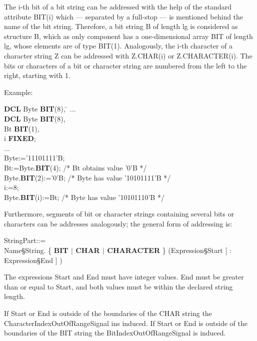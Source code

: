 

The i-th bit of a bit string can be addressed with the help of the
standard attribute BIT(i) which --- separated by a full-stop --- is mentioned
behind the name of the bit string. Therefore, a bit string B of length
lg is considered as structure B, which as only component has a
one-dimensional array BIT of length lg, whose elements are of type
BIT(1). Analogously, the i-th character of a character string Z can be
addressed with Z.CHAR(i) or Z.CHARACTER(i). The bits or characters of a
bit or character string are numbered from the left to the right, starting with 1.

Example:

\begin{tabbing}
{\bf DCL} Byte {\bf BIT}(8), \= \kill
... \> \\
{\bf DCL} Byte {\bf BIT}(8), \> \\
\x Bt {\bf BIT}(1),   \> \\
\x i {\bf FIXED};     \> \\
... \> \\
Byte:='11101111'B;            \> \\
Bt:=Byte.{\bf BIT}(4);        \> /* Bt obtains value '0'B */\\
Byte.{\bf BIT}(2):='0'B;      \> /* Byte has value '10101111'B */\\
i:=8; \> \\
Byte.{\bf BIT}(i):=Bt;        \> /* Byte has value '10101110'B */
\end{tabbing}

Furthermore, segments of bit or character strings containing several
bits or characters can be addresses analogously; the general form of
addressing is:

\begin{front}
StringPart::=\\
\x Name\S String. \{ {\bf BIT $\mid$ CHAR $\mid$ CHARACTER} \} (Expression\S Start [ : Expression\S End ] )
\end{front}
\begin{grammar}

\end{grammar}


The expressions Start and End must have integer values. End must be
greater than or equal to Start, and both values must be within the
declared string length.
\begin{added}
If Start or End is outside of the boundaries of  the CHAR string
the CharacterIndexOutOfRangeSignal ins induced.
If Start or End is outside of the boundaries of  the BIT string
the BitIndexOutOfRangeSignal is induced.
\end{added}

